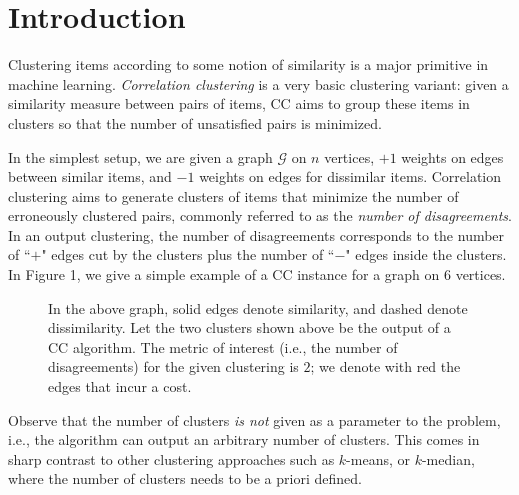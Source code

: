 \documentclass{article} %
\begin{document}
\section{Introduction}

%
Clustering items according to some notion of similarity is a major primitive in machine learning.
{\it Correlation clustering} is a very basic clustering variant: given a similarity measure between pairs of items, CC aims to group these items in clusters so that the number of unsatisfied pairs is minimized.

In the simplest setup, we are given a graph $\mathcal{G}$ on $n$ vertices, $+1$ weights on edges between similar items, and $-1$ weights on edges for dissimilar items. 
Correlation clustering aims to generate clusters of items that minimize the number of erroneously clustered pairs, commonly referred to as the {\it number of disagreements}.
In an output clustering, the number of disagreements corresponds to the number of ``$+$" edges cut by the clusters plus the number of ``$-$" edges inside the clusters.
In Figure 1, we give a simple example of a CC instance for a graph on 6 vertices.
 \begin{figure}[h]
\caption{In the above graph, solid edges denote similarity, and dashed denote dissimilarity.
Let the two clusters shown above be the output of a CC algorithm.
The metric of interest (i.e., the number of disagreements) for the given clustering is $2$; we denote with red the edges that incur a cost.}
\label{fig:graph_example}
\end{figure}     

Observe that the number of clusters {\it is not} given as a parameter to the problem, i.e., the algorithm can output an arbitrary number of clusters.
This comes in sharp contrast to other clustering approaches such as $k$-means, or $k$-median, where the number of clusters needs to be a priori defined.
\end{document}
